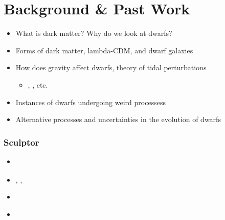 \section{Background \& Past Work}\label{background-past-work}

\begin{itemize}
\tightlist
\item
  What is dark matter? Why do we look at dwarfs?
\item
  Forms of dark matter, lambda-CDM, and dwarf galaxies
\item
  How does gravity affect dwarfs, theory of tidal perturbations

  \begin{itemize}
  \tightlist
  \item
    \citet{EN2021}, \citet{PNM2008}, etc.
  \end{itemize}
\item
  Instances of dwarfs undergoing weird processess
\item
  Alternative processes and uncertainties in the evolution of dwarfs
\end{itemize}

\subsubsection{Sculptor}\label{sculptor}

\begin{itemize}
\tightlist
\item
  \citet{sestito+2023a}
\item
  \citet{tolstoy+2023}, \citet{arroyo-polonio+2023},
  \citet{arroyo-polonio+2024}
\item
  \citet{battaglia+2008}
\item
  \citet{iorio+2019}
\end{itemize}

